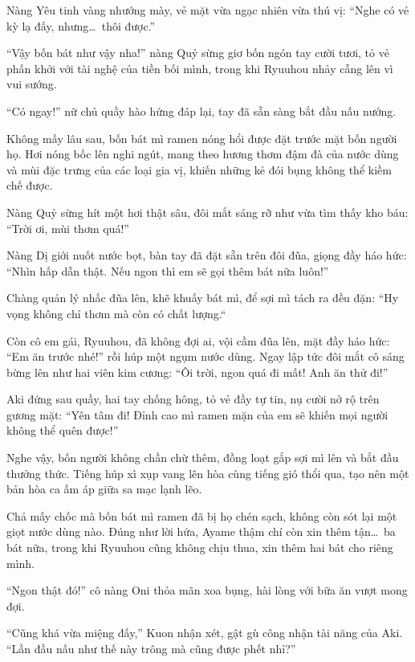 \documentclass[../main.tex]{subfiles}
\begin{document}
Nàng Yêu tinh vàng nhướng mày, vẻ mặt vừa ngạc nhiên vừa thú vị: ``Nghe có vẻ kỳ lạ đấy, nhưng\dots\ thôi được.''

``Vậy bốn bát như vậy nha!'' nàng Quỷ sừng giơ bốn ngón tay cười tươi, tỏ vẻ phấn khởi với tài nghệ của tiền bối mình, trong khi Ryuuhou nhảy cẫng lên vì vui sướng.

``Có ngay!'' nữ chủ quầy hào hứng đáp lại, tay đã sẵn sàng bắt đầu nấu nướng.

\ct

Không mấy lâu sau, bốn bát mì ramen nóng hổi được đặt trước mặt bốn người họ. Hơi nóng bốc lên nghi ngút, mang theo hương thơm đậm đà của nước dùng và mùi đặc trưng của các loại gia vị, khiến những kẻ đói bụng không thể kiềm chế được.

Nàng Quỷ sừng hít một hơi thật sâu, đôi mắt sáng rỡ như vừa tìm thấy kho báu: ``Trời ơi, mùi thơm quá!''

Nàng Dị giới nuốt nước bọt, bàn tay đã đặt sẵn trên đôi đũa, giọng đầy háo hức: ``Nhìn hấp dẫn thật. Nếu ngon thì em sẽ gọi thêm bát nữa luôn!''

Chàng quản lý nhấc đũa lên, khẽ khuấy bát mì, để sợi mì tách ra đều đặn: ``Hy vọng không chỉ thơm mà còn có chất lượng.``

Còn cô em gái, Ryuuhou, đã không đợi ai, vội cầm đũa lên, mặt đầy háo hức: ``Em ăn trước nhé!'' rồi húp một ngụm nước dùng. Ngay lập tức đôi mắt cô sáng bừng lên như hai viên kim cương: ``Ôi trời, ngon quá đi mất! Anh ăn thử đi!''

Aki đứng sau quầy, hai tay chống hông, tỏ vẻ đầy tự tin, nụ cười nở rộ trên gương mặt: ``Yên tâm đi! Đỉnh cao mì ramen mặn của em sẽ khiến mọi người không thể quên được!''

Nghe vậy, bốn người không chần chừ thêm, đồng loạt gắp sợi mì lên và bắt đầu thưởng thức. Tiếng húp xì xụp vang lên hòa cùng tiếng gió thổi qua, tạo nên một bản hòa ca ấm áp giữa sa mạc lạnh lẽo.

\ct

Chả mấy chốc mà bốn bát mì ramen đã bị họ chén sạch, không còn sót lại một giọt nước dùng nào. Đúng như lời hứa, Ayame thậm chí còn xin thêm tận\dots\ ba bát nữa, trong khi Ryuuhou cũng không chịu thua, xin thêm hai bát cho riêng mình.


``Ngon thật đó!'' cô nàng Oni thỏa mãn xoa bụng, hài lòng với bữa ăn vượt mong đợi.

``Cũng khá vừa miệng đấy,'' Kuon nhận xét, gật gù công nhận tài năng của Aki. ``Lần đầu nấu như thế này trông mà cũng được phết nhỉ?''
\end{document}
